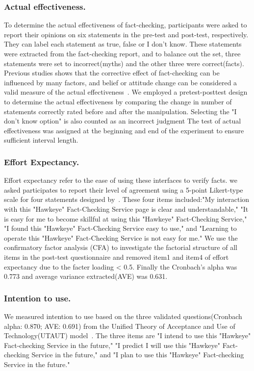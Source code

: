 \subsubsection{Actual effectiveness.}
To determine the actual effectiveness of fact-checking, participants were asked to report their opinions on six statements in the pre-test and post-test, respectively.
They can label each statement as true, false or I don't know.
These statements were extracted from the fact-checking report, and to balance out the set, three statements were set to incorrect(myths) and the other three were correct(facts).
Previous studies shows that the corrective effect of fact-checking can be influenced by many factors, and belief or attitude change can be considered a valid measure of the actual effectiveness~\cite{swire2017role,fennis2015psychology}.
We employed a pretest-posttest design to determine the actual effectiveness by comparing the change in number of statements correctly rated before and after the manipulation. Selecting the "I don't know option" is also counted as an incorrect judgment
The test of actual effectiveness was assigned at the beginning and end of the experiment to ensure sufficient interval length.

\subsubsection{Effort Expectancy.}
Effort expectancy refer to the ease of using these interfaces to verify facts.
we asked participates to report their level of agreement using a 5-point Likert-type scale for four statements designed by~\cite{venkatesh2003user}.
These four items included:"My interaction with this "Hawkeye" Fact-Checking Service page is clear and understandable,"
"It is easy for me to become skillful at using this "Hawkeye" Fact-Checking Service,"
"I found this "Hawkeye" Fact-Checking Service easy to use," and
"Learning to operate this "Hawkeye" Fact-Checking Service is not easy for me."
We use the confirmatory factor analysis (CFA) to investigate the factorial structure of all items in the post-test questionnaire and removed item1 and item4 of effort expectancy due to the facter loading < 0.5.
Finally the Cronbach’s alpha was  0.773 and average variance extracted(AVE) was 0.631.

\subsubsection{Intention to use.}
We measured intention to use based on the three validated questions(Cronbach alpha: 0.870; AVE: 0.691) from the Unified Theory of Acceptance and Use of Technology(UTAUT) model~\cite{venkatesh2003user}.
The three items are "I intend to use this "Hawkeye" Fact-checking Service in the future,"
"I predict I will use this "Hawkeye" Fact-checking Service in the future," and 
"I plan to use this "Hawkeye" Fact-checking Service in the future." 

